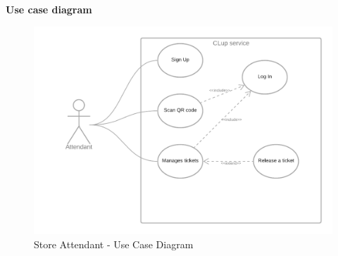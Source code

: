 \documentclass[table, 12pt]{article}
\begin{document}
\begin{minipage}{\textwidth}
    \textbf{Use case diagram}
    \begin{figure}[H]
        \begin{center}
            \includegraphics[width=\textwidth]{assets/use_case_diagram_assistant.png}
            \caption{Store Attendant - Use Case Diagram}
        \end{center}
    \end{figure}
\end{minipage}
\end{document}
